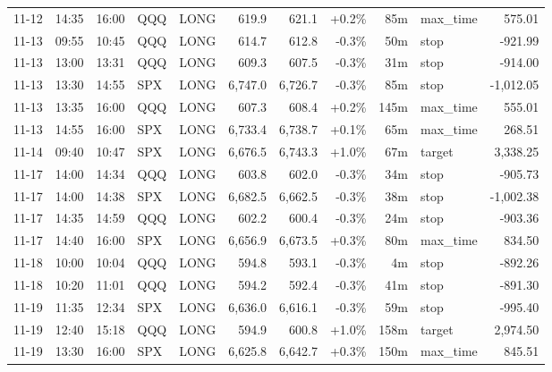 \documentclass[11pt,a4paper,twoside]{article}
\begin{document}
\begin{center}
\begin{longtable}{>{\color{txtmain}}l l l l l r r r r >{\color{txtmain}}l r}
11-12 & 14:35 & 16:00 & QQQ & LONG & 619.9 & 621.1 & \textcolor{wingreen}{+0.2\%} & 85m & max\_time & \textcolor{wingreen}{575.01} \\
11-13 & 09:55 & 10:45 & QQQ & LONG & 614.7 & 612.8 & \textcolor{lossred}{-0.3\%} & 50m & stop & \textcolor{lossred}{-921.99} \\
11-13 & 13:00 & 13:31 & QQQ & LONG & 609.3 & 607.5 & \textcolor{lossred}{-0.3\%} & 31m & stop & \textcolor{lossred}{-914.00} \\
11-13 & 13:30 & 14:55 & SPX & LONG & 6,747.0 & 6,726.7 & \textcolor{lossred}{-0.3\%} & 85m & stop & \textcolor{lossred}{-1,012.05} \\
11-13 & 13:35 & 16:00 & QQQ & LONG & 607.3 & 608.4 & \textcolor{wingreen}{+0.2\%} & 145m & max\_time & \textcolor{wingreen}{555.01} \\
11-13 & 14:55 & 16:00 & SPX & LONG & 6,733.4 & 6,738.7 & \textcolor{wingreen}{+0.1\%} & 65m & max\_time & \textcolor{wingreen}{268.51} \\
11-14 & 09:40 & 10:47 & SPX & LONG & 6,676.5 & 6,743.3 & \textcolor{wingreen}{+1.0\%} & 67m & target & \textcolor{wingreen}{3,338.25} \\
11-17 & 14:00 & 14:34 & QQQ & LONG & 603.8 & 602.0 & \textcolor{lossred}{-0.3\%} & 34m & stop & \textcolor{lossred}{-905.73} \\
11-17 & 14:00 & 14:38 & SPX & LONG & 6,682.5 & 6,662.5 & \textcolor{lossred}{-0.3\%} & 38m & stop & \textcolor{lossred}{-1,002.38} \\
11-17 & 14:35 & 14:59 & QQQ & LONG & 602.2 & 600.4 & \textcolor{lossred}{-0.3\%} & 24m & stop & \textcolor{lossred}{-903.36} \\
11-17 & 14:40 & 16:00 & SPX & LONG & 6,656.9 & 6,673.5 & \textcolor{wingreen}{+0.3\%} & 80m & max\_time & \textcolor{wingreen}{834.50} \\
11-18 & 10:00 & 10:04 & QQQ & LONG & 594.8 & 593.1 & \textcolor{lossred}{-0.3\%} & 4m & stop & \textcolor{lossred}{-892.26} \\
11-18 & 10:20 & 11:01 & QQQ & LONG & 594.2 & 592.4 & \textcolor{lossred}{-0.3\%} & 41m & stop & \textcolor{lossred}{-891.30} \\
11-19 & 11:35 & 12:34 & SPX & LONG & 6,636.0 & 6,616.1 & \textcolor{lossred}{-0.3\%} & 59m & stop & \textcolor{lossred}{-995.40} \\
11-19 & 12:40 & 15:18 & QQQ & LONG & 594.9 & 600.8 & \textcolor{wingreen}{+1.0\%} & 158m & target & \textcolor{wingreen}{2,974.50} \\
11-19 & 13:30 & 16:00 & SPX & LONG & 6,625.8 & 6,642.7 & \textcolor{wingreen}{+0.3\%} & 150m & max\_time & \textcolor{wingreen}{845.51} \\

\end{longtable}
\end{center}
\end{document}
